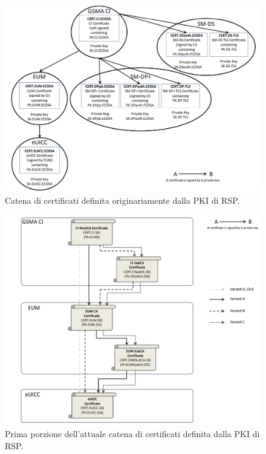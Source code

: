 \documentclass[10pt, twoside, openany]{book}
\begin{document}
\begin{figure}
\includegraphics[width=\linewidth]{cert-chain.png}
\caption{Catena di certificati definita originariamente dalla PKI di RSP.}
\label{fig:cert-chain}
\end{figure}
\begin{figure}
\includegraphics[width=\linewidth]{cert-chain-new1.png}
\caption{Prima porzione dell'attuale catena di certificati definita dalla PKI di RSP.}
\label{fig:cert-chain-new1}
\end{figure}
\end{document}
